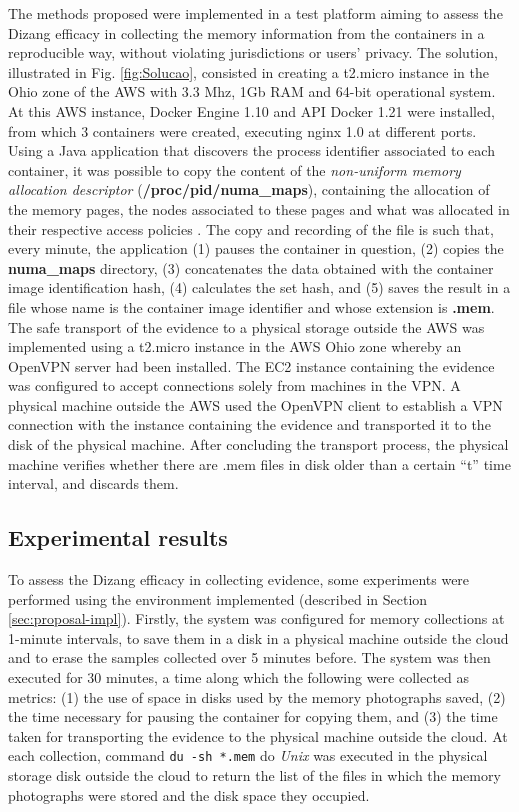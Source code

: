 \documentclass[conference]{IEEEtran}
\newcommand{\fancyname}{Dizang }
\begin{document}
The methods proposed were implemented in a test platform aiming to assess the \fancyname efficacy in collecting the memory information from the containers in a reproducible way, without violating jurisdictions or users’ privacy.
%
The solution, illustrated in Fig. \ref{fig:Solucao}, consisted in creating a t2.micro instance in the Ohio zone of the AWS with 3.3 Mhz, 1Gb RAM and 64-bit operational system. 
%
At this AWS instance, Docker Engine 1.10 and API Docker 1.21 were installed, from which 3 containers were created, executing nginx 1.0 at different ports. 
%
Using a Java application that discovers the process identifier associated to each container, it was possible to copy the content of the \textit{non-uniform memory allocation descriptor} (\textbf{/proc/pid/numa\_maps}), containing the allocation of the memory pages, the nodes associated to these pages and what was allocated in their respective access policies \cite{UnixManPages_numa_maps}.
%
The copy and recording of the file is such that, every minute, the application (1) pauses the container in question, (2) copies the \textbf{numa\_maps} directory, (3) concatenates the data obtained with the container image identification hash, (4) calculates the set hash, and (5) saves the result in a file whose name is the container image identifier and whose extension is \textbf{.mem}. 
%
The safe transport of the evidence to a physical storage outside the AWS was implemented using a t2.micro instance in the AWS Ohio zone whereby an OpenVPN server had been installed.
%
The EC2 instance containing the evidence was configured to accept connections solely from machines in the VPN.
%
A physical machine outside the AWS used the OpenVPN client to establish a VPN connection with the instance containing the evidence and transported it to the disk of the physical machine.
%
After concluding the transport process, the physical machine verifies whether there are .mem files in disk older than a certain “t” time interval, and discards them.
%

\subsection{Experimental results}
\label{sec:proposal-exp}

To assess the \fancyname efficacy in collecting evidence, some experiments were performed using the environment implemented (described in Section \ref{sec:proposal-impl}).
%
Firstly, the system was configured for memory collections at 1-minute intervals, to save them in a disk in a physical machine outside the cloud and to erase the samples collected over 5 minutes before. 
%
The system was then executed for 30 minutes, a time along which the following were collected as metrics: (1) the use of space in disks used by the memory photographs saved, (2) the time necessary for pausing the container for copying them, and (3) the time taken for transporting the evidence to the physical machine outside the cloud.
%
At each collection, command \texttt{du -sh *.mem} do \textit{Unix} was executed in the physical storage disk outside the cloud to return the list of the files in which the memory photographs were stored and the disk space they occupied.
%
\end{document}
